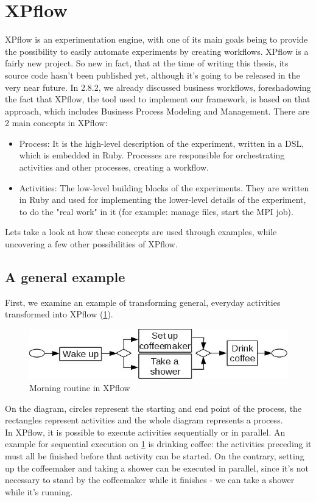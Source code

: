 \section{XPflow}
XPflow is an experimentation engine, with one of its main goals being
to provide the possibility to easily automate experiments by creating
workflows. XPflow is a fairly new project. So new in fact, that at the
time of writing this thesis, its source code hasn't been published
yet, although it's going to be released in the very near future.
In 2.8.2, we already discussed business workflows, foreshadowing the
fact that XPflow, the tool used to implement our framework, is based
on that approach, which includes Business Process Modeling and
Management. There are 2 main concepts in XPflow\cite{bn12_2}:
\begin{itemize}
\item Process: It is the high-level description of the experiment,
  written in a DSL, which is embedded in Ruby. Processes are
  responsible for orchestrating activities and other processes,
  creating a workflow.
\item Activities: The low-level building blocks of the
  experiments. They are written in Ruby and used for implementing the
  lower-level details of the experiment, to do the "real work" in it
  (for example: manage files, start the MPI job).
\end{itemize}
Lets take a look at how these concepts are used through
examples, while uncovering a few other possibilities of XPflow.
\subsection{A general example}
First, we examine an example of transforming general, everyday
activities transformed into XPflow (\ref{fig:xpflow_example1}).
\begin{figure}[htbp]
  \centering
    \includegraphics[scale=0.7]{./Figures/xpflow_example1.jpg}
  \caption[Morning routine in XPflow]{Morning routine in XPflow}
  \label{fig:xpflow_example1}
\end{figure}
On the diagram, circles represent the starting and end point of the
process, the rectangles represent activities and the whole diagram
represents a process.\\[0.3cm]
In XPflow, it is possible to execute activities sequentially or in
parallel. An example for sequential execution on
\ref{fig:xpflow_example1} is drinking coffee: the activities preceding
it must all be finished before that activity can be
started. On the contrary, setting up the coffeemaker and taking a
shower can be executed in parallel, since it's not necessary to stand
by the coffeemaker while it finishes - we can take a shower while it's
running.
